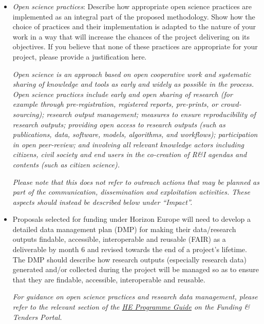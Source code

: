 \documentclass[12pt,draftproposal]{msca-pf}
\begin{document}
\begin{mscaexplanation}
\begin{itemize}
    \item \emph{Open science practices}: Describe how appropriate open science
    practices are implemented as an integral part of the proposed methodology.
    Show how the choice of practices and their implementation is adapted to the
    nature of your work in a way that will increase the chances of the project
    delivering on its objectives. If you believe that none of
    these practices are appropriate for your project, please provide a justification
    here.

    \emph{Open science is an approach based on open cooperative work and systematic
    sharing of knowledge and tools as early and widely as possible in the process.
    Open science practices include early and open sharing of research (for example
    through pre-registration, registered reports, pre-prints, or crowd-sourcing);
    research output management; measures to ensure reproducibility of research
    outputs; providing open access to research outputs (such as publications,
    data, software, models, algorithms, and workflows); participation in open
    peer-review; and involving all relevant knowledge actors including citizens,
    civil society and end users in the co-creation of R\&I agendas and contents
    (such as citizen science).}

    \emph{Please note that this does not refer to outreach actions that may be
    planned as part of the communication, dissemination and exploitation activities.
    These aspects should instead be described below under ``Impact''.}

    \item Proposals selected for funding under Horizon Europe will need to develop
    a detailed data management plan (DMP) for making their data/research outputs
    findable, accessible, interoperable and reusable (FAIR) as a deliverable by
    month 6 and revised towards the end of a project's lifetime. The DMP should
    describe how research outputs (especially research data) generated and/or
    collected during the project will be managed so as to ensure that they are
    findable, accessible, interoperable and reusable.

    \emph{For guidance on open science practices and research data management,
    please refer to the relevant section of the
    \href{https://ec.europa.eu/info/funding-tenders/opportunities/docs/2021-2027/horizon/temp-form/af/af_he-msca-pf_en.pdf}{HE Programme Guide}
    on the Funding \& Tenders Portal.}
\end{itemize}
\end{mscaexplanation}
\end{document}
